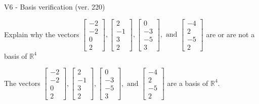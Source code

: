 \begin{exercise}
  \begin{exerciseTitle}V6 - Basis verification (ver. 220)\end{exerciseTitle}
  \begin{exerciseStatement}
    Explain why the vectors \(\left[\begin{array}{r}
-2 \\
-2 \\
0 \\
2
\end{array}\right] , \left[\begin{array}{r}
2 \\
-1 \\
3 \\
2
\end{array}\right] , \left[\begin{array}{r}
0 \\
-3 \\
-5 \\
3
\end{array}\right] , \text{ and } \left[\begin{array}{r}
-4 \\
2 \\
-5 \\
2
\end{array}\right]\) are or are not a basis of \(\mathbb{R}^4\)	


  \end{exerciseStatement}
  \begin{exerciseAnswer}
   The vectors \(\left[\begin{array}{r}
-2 \\
-2 \\
0 \\
2
\end{array}\right] , \left[\begin{array}{r}
2 \\
-1 \\
3 \\
2
\end{array}\right] , \left[\begin{array}{r}
0 \\
-3 \\
-5 \\
3
\end{array}\right] , \text{ and } \left[\begin{array}{r}
-4 \\
2 \\
-5 \\
2
\end{array}\right]\) 
  	 are  a basis of \(\mathbb{R}^4\).
  


  \end{exerciseAnswer}
\end{exercise}